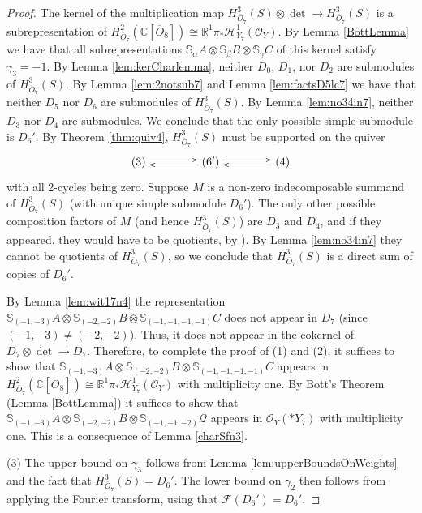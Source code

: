 \documentclass[11pt,reqno]{amsart}
\newcommand{\oo}{\otimes}
\newcommand{\bS}{\mathbb{S}}
\newcommand{\C}{\mathbb{C}}
\renewcommand{\det}{\operatorname{det}}
\newcommand{\mc}[1]{\mathcal{#1}}
\newcommand{\ol}[1]{\overline{#1}}
\numberwithin{equation}{section}
\begin{document}
\begin{proof}
The kernel of the multiplication map $H^3_{\ol{O}_7}(S)\oo \det \to H^3_{\ol{O}_7}(S)$ is a subrepresentation of $H^2_{\ol{O}_7}(\C[\ol{O}_8])\cong \mathbb{R}^1\pi_{\ast}\mathscr{H}^1_{Y_7}(\mc{O}_Y)$. By Lemma \ref{BottLemma} we have that all subrepresentations $\bS_{\alpha}A\oo \bS_{\beta}B\oo \bS_{\gamma}C$ of this kernel satisfy $\gamma_3=-1$. By Lemma \ref{lem:kerCharlemma}, neither $D_0$, $D_1$, nor $D_2$ are submodules of $H^3_{\ol{O}_7}(S)$. By Lemma \ref{lem:2notsub7} and Lemma \ref{lem:factsD5lc7} we have that neither $D_5$ nor $D_6$ are submodules of $H^3_{\ol{O}_7}(S)$. By Lemma \ref{lem:no34in7}, neither $D_3$ nor $D_4$ are submodules. We conclude that the only possible simple submodule is $D_6'$. By Theorem \ref{thm:quiv4},  $H^3_{\ol{O}_7}(S)$  must be supported on the quiver
\[\xymatrix@C+1.6pc{(3) \ar@<0.5ex>[r] & \ar@<0.5ex>[l] (6') \ar@<0.5ex>[r] & \ar@<0.5ex>[l] (4) }\]
with all 2-cycles being zero. Suppose $M$ is a non-zero indecomposable summand of $H^3_{\ol{O}_7}(S)$ (with unique simple submodule $D_6'$). The only other possible composition factors of $M$ (and hence $H^3_{\ol{O}_7}(S)$)  are $D_3$ and $D_4$, and if they appeared, they would have to be quotients, by \cite[Theorem 2.13]{lHorincz2019categories}). By Lemma \ref{lem:no34in7} they cannot be quotients of  $H^3_{\ol{O}_7}(S)$, so we conclude that $H^3_{\ol{O}_7}(S)$ is a direct sum of copies of $D_6'$.	

By Lemma \ref{lem:wit17n4} the representation $\bS_{(-1,-3)}A\oo \bS_{(-2,-2)}B\oo \bS_{(-1,-1,-1,-1)}C$ does not appear in $D_7$ (since $(-1,-3)\neq (-2,-2)$). Thus, it does not appear in the cokernel of  $D_7\oo \det \to D_7$. Therefore, to complete the proof of (1) and (2), it suffices to show that $\bS_{(-1,-3)}A\oo \bS_{(-2,-2)}B\oo \bS_{(-1,-1,-1,-1)}C$ appears in $H^2_{\ol{O}_7}(\C[\ol{O}_8])\cong \mathbb{R}^1\pi_{\ast}\mathscr{H}^1_{Y_7}(\mc{O}_Y)$ with multiplicity one. By Bott's Theorem (Lemma \ref{BottLemma}) it suffices to show that  $\bS_{(-1,-3)}A\oo \bS_{(-2,-2)}B\oo \bS_{(-1,-1,-2)}\mc{Q}$ appears in $\mc{O}_Y(\ast Y_7)$ with multiplicity one. This is a consequence of Lemma \ref{charSfn3}.

(3) The upper bound on $\gamma_3$ follows from Lemma \ref{lem:upperBoundsOnWeights} and the fact that $H^3_{\ol{O}_7}(S)=D_6'$. The lower bound on $\gamma_2$ then follows from applying the Fourier transform, using that $\mc{F}(D_6')=D_6'$.


\end{proof}
\end{document}
